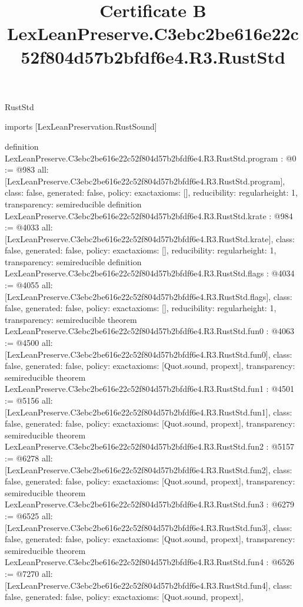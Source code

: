 \begin{lexlean}{RustStd}
\title{Certificate B LexLeanPreserve.C3ebc2be616e22c52f804d57b2bfdf6e4.R3.RustStd}
\begin{coremodule}
imports [LexLeanPreservation.RustSound]

definition LexLeanPreserve.C3ebc2be616e22c52f804d57b2bfdf6e4.R3.RustStd.program : @0 := @983 {
  all: [LexLeanPreserve.C3ebc2be616e22c52f804d57b2bfdf6e4.R3.RustStd.program],
  class: false,
  generated: false,
  policy: exact{axioms: []},
  reducibility: regular{height: 1},
  transparency: semireducible
}
definition LexLeanPreserve.C3ebc2be616e22c52f804d57b2bfdf6e4.R3.RustStd.krate : @984 := @4033 {
  all: [LexLeanPreserve.C3ebc2be616e22c52f804d57b2bfdf6e4.R3.RustStd.krate],
  class: false,
  generated: false,
  policy: exact{axioms: []},
  reducibility: regular{height: 1},
  transparency: semireducible
}
definition LexLeanPreserve.C3ebc2be616e22c52f804d57b2bfdf6e4.R3.RustStd.flags : @4034 := @4055 {
  all: [LexLeanPreserve.C3ebc2be616e22c52f804d57b2bfdf6e4.R3.RustStd.flags],
  class: false,
  generated: false,
  policy: exact{axioms: []},
  reducibility: regular{height: 1},
  transparency: semireducible
}
theorem LexLeanPreserve.C3ebc2be616e22c52f804d57b2bfdf6e4.R3.RustStd.fun0 : @4063 := @4500 {
  all: [LexLeanPreserve.C3ebc2be616e22c52f804d57b2bfdf6e4.R3.RustStd.fun0],
  class: false,
  generated: false,
  policy: exact{axioms: [Quot.sound, propext]},
  transparency: semireducible
}
theorem LexLeanPreserve.C3ebc2be616e22c52f804d57b2bfdf6e4.R3.RustStd.fun1 : @4501 := @5156 {
  all: [LexLeanPreserve.C3ebc2be616e22c52f804d57b2bfdf6e4.R3.RustStd.fun1],
  class: false,
  generated: false,
  policy: exact{axioms: [Quot.sound, propext]},
  transparency: semireducible
}
theorem LexLeanPreserve.C3ebc2be616e22c52f804d57b2bfdf6e4.R3.RustStd.fun2 : @5157 := @6278 {
  all: [LexLeanPreserve.C3ebc2be616e22c52f804d57b2bfdf6e4.R3.RustStd.fun2],
  class: false,
  generated: false,
  policy: exact{axioms: [Quot.sound, propext]},
  transparency: semireducible
}
theorem LexLeanPreserve.C3ebc2be616e22c52f804d57b2bfdf6e4.R3.RustStd.fun3 : @6279 := @6525 {
  all: [LexLeanPreserve.C3ebc2be616e22c52f804d57b2bfdf6e4.R3.RustStd.fun3],
  class: false,
  generated: false,
  policy: exact{axioms: [Quot.sound, propext]},
  transparency: semireducible
}
theorem LexLeanPreserve.C3ebc2be616e22c52f804d57b2bfdf6e4.R3.RustStd.fun4 : @6526 := @7270 {
  all: [LexLeanPreserve.C3ebc2be616e22c52f804d57b2bfdf6e4.R3.RustStd.fun4],
  class: false,
  generated: false,
  policy: exact{axioms: [Quot.sound, propext]},
}
\end{coremodule}
\end{lexlean}
